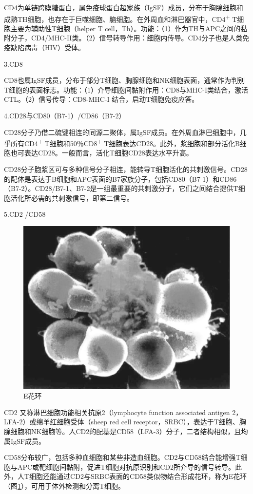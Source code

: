 CD4为单链跨膜糖蛋白，属免疫球蛋白超家族（IgSF）成员，分布于胸腺细胞和成熟TH细胞，也存在于巨噬细胞、脑细胞。在外周血和淋巴器官中，CD4\textsuperscript{+}
T细胞主要为辅助性T细胞（helper T
cell，Th）。功能：（1）作为TH与APC之间的黏附分子，CD4/MHC-II类。（2）信号转导作用：细胞内传导。CD4分子也是人类免疫缺陷病毒（HIV）受体。

3.CD8

CD8也属IgSF成员，分布于部分T细胞、胸腺细胞和NK细胞表面，通常作为判别T细胞的表面标志。功能：（1）介导细胞间黏附作用：CD8与MHC-I类结合，激活CTL。（2）信号传导：CD8-MHC-I
结合，启动T细胞免疫应答。

4.CD28与CD80（B7-1）/CD86（B7-2）

CD28分子乃借二硫键相连的同源二聚体，属IgSF成员。在外周血淋巴细胞中，几乎所有CD4\textsuperscript{+}
T细胞和50％CD8\textsuperscript{+}
T细胞表达CD28。此外，浆细胞和部分活化B细胞也可表达CD28。一般而言，活化T细胞CD28表达水平升高。

CD28分子胞浆区可与多种信号分子相连，能转导T细胞活化的共刺激信号。CD28的配体是表达于B细胞和APC表面的B7家族分子，包括CD80（B7-1）和CD86（B7-2）。CD28/B7-1、B7-2是一组最重要的共刺激分子，它们之间结合提供T细胞活化所必需的共刺激信号，即第二信号。

5.CD2 /CD58

\begin{figure}[!htbp]
 \centering
 \includegraphics[width=.6\textwidth]{./images/Image00113.jpg}
 \captionsetup{justification=centering}
 \caption{E花环}
 \label{fig8-3}
  \end{figure} 

CD2 又称淋巴细胞功能相关抗原2（lymphocyte function associated antigen
2，LFA-2）或绵羊红细胞受体（sheep red cell
receptor，SRBC），表达于T细胞、胸腺细胞和NK细胞等。人CD2的配基是CD58（LFA-3）分子，二者结构相似，且均属IgSF成员。

CD58分布较广，包括多种血细胞和某些非造血细胞。CD2与CD58结合能增强T细胞与APC或靶细胞间黏附，促进T细胞对抗原识别和CD2所介导的信号转导。此外，人T细胞还能通过CD2与SRBC表面的CD58类似物结合形成花环，称为E花环（图\ref{fig8-3}），可用于体外检测和分离T细胞。


